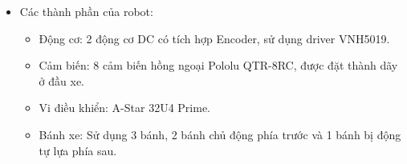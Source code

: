 \begin{itemize}
\begin{figure}[H]
            \end{figure}
            \item Các thành phần của robot:
                \begin{itemize}[label=\textendash]
                    \item Động cơ: 2 động cơ DC có tích hợp Encoder, sử dụng driver VNH5019.
                    \item Cảm biến: 8 cảm biến hồng ngoại Pololu QTR-8RC, được đặt thành dãy ở đầu xe.
                    \item Vi điều khiển: A-Star 32U4 Prime.
                    \item Bánh xe: Sử dụng 3 bánh, 2 bánh chủ động phía trước và 1 bánh bị động tự lựa phía sau.
                \end{itemize}
        \end{itemize}



